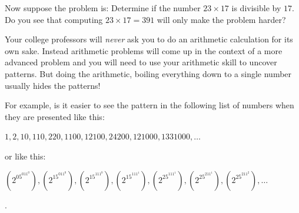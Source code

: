 Now suppose the problem is: Determine  if the number
$23\times17$ is divisible by $17$. Do you see that computing
$23\times17=391$ will only make the problem harder?

Your college professors will \emph{never} ask you to do an arithmetic
calculation for its own sake. Instead arithmetic problems will come up
in the context of a more advanced problem and you will need to use
your arithmetic skill to uncover patterns. But doing the arithmetic,
boiling everything down to a single number usually hides the
  patterns!

For example, is it easier to see the pattern in the following
list of numbers when they are presented like this:\\
\centerline{$1, 2, 10, 110, 220, 1100, 12100, 24200, 121000, 1331000,
  \ldots$ }
or like this:\\
\centerline{$(2^05^011^0), (2^15^011^0),
  (2^15^111^0), (2^15^111^1),
  (2^25^111^1),
  (2^25^211^1), (2^25^211^2), \ldots$}.





